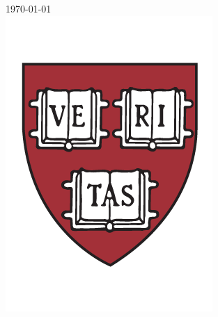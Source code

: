 \begin{titlepage}


{\large \today}\\[1cm] %


\includegraphics[width=0.29\linewidth]{logo.png}\\[1cm] %
 

\vfill %

\end{titlepage}






